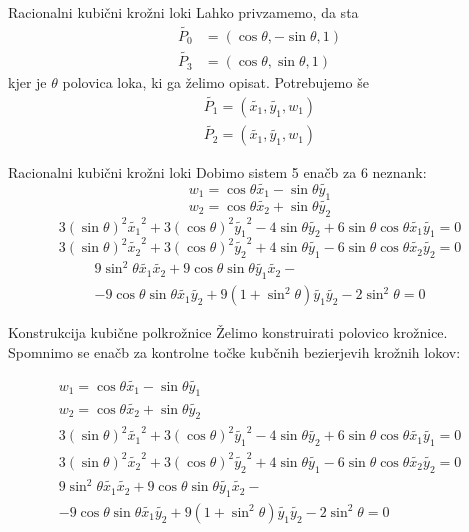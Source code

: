 \documentclass[t]{beamer}
\begin{document}
\begin{frame}{Racionalni kubični krožni loki}
Lahko privzamemo, da sta 
\begin{align*}
\tilde{P_{0}} &= (\cos \theta, - \sin \theta, 1) \\
\tilde{P_{3}} &= (\cos \theta, \sin \theta, 1)
\end{align*}
kjer je $\theta$ polovica loka, ki ga želimo opisat. 
Potrebujemo še 
\begin{align*}
\tilde{P_{1}} = (\tilde{x_{1}}, \tilde{y_{1}}, w_{1}) \\
\tilde{P_{2}} = (\tilde{x_{1}}, \tilde{y_{1}}, w_{1})
\end{align*}

\end{frame}

\begin{frame}{Racionalni kubični krožni loki}
Dobimo sistem 5 enačb za 6 neznank:
$$
w_{1} = \cos \theta \tilde{x_{1}} - \sin \theta  \tilde{y_{1}} 
$$
$$
w_{2} = \cos \theta  \tilde{x_{2}} + \sin \theta  \tilde{y_{2}} 
$$
$$
3(\sin \theta )^{2} \tilde{x_{1}}^2 + 3(\cos \theta )^{2} \tilde{y_{1}}^2 - 4 \sin \theta \tilde{y_{2}} + 6\sin \theta \cos \theta \tilde{x_{1}}\tilde{y_{1}} = 0 
$$
$$
3(\sin \theta )^{2} \tilde{x_{2}}^2 + 3(\cos \theta )^{2} \tilde{y_{2}}^2 + 4 \sin \theta 
\tilde{y_{1}} - 6\sin \theta \cos \theta \tilde{x_{2}}\tilde{y_{2}} = 0 
$$
\begin{align*}
9\sin^{2}\theta \tilde{x_{1}}\tilde{x_{2}} + 9 \cos \theta \sin \theta \tilde{y_{1}}\tilde{x_{2}} -\\ -9\cos \theta \sin \theta \tilde{x_{1}} \tilde{y_{2}} + 9 (1 + \sin^2 \theta) \tilde{y_{1}} \tilde{y_{2}} - 2\sin^2\theta = 0
\end{align*}

\end{frame}


\begin{frame}{Konstrukcija kubične polkrožnice}
Želimo konstruirati polovico krožnice. Spomnimo se enačb za kontrolne točke kubčnih bezierjevih krožnih lokov:

\begin{align*}
w_{1} = \cos \theta \tilde{x_{1}} - \sin \theta  \tilde{y_{1}} \\
w_{2} = \cos \theta  \tilde{x_{2}} + \sin \theta  \tilde{y_{2}} \\
3(\sin \theta )^{2} \tilde{x_{1}}^2 + 3(\cos \theta )^{2} \tilde{y_{1}}^2 - 4 \sin \theta \tilde{y_{2}} + 6\sin \theta \cos \theta \tilde{x_{1}}\tilde{y_{1}} = 0 \\
3(\sin \theta )^{2} \tilde{x_{2}}^2 + 3(\cos \theta )^{2} \tilde{y_{2}}^2 + 4 \sin \theta \tilde{y_{1}} - 6\sin \theta \cos \theta \tilde{x_{2}}\tilde{y_{2}} = 0 \\
9\sin^{2}\theta \tilde{x_{1}}\tilde{x_{2}} + 9 \cos \theta \sin \theta \tilde{y_{1}}\tilde{x_{2}} -\\ -9\cos \theta \sin \theta \tilde{x_{1}} \tilde{y_{2}} + 9 (1 + \sin^2 \theta) \tilde{y_{1}} \tilde{y_{2}} - 2\sin^2\theta = 0
\end{align*}
\end{frame}
\end{document}
